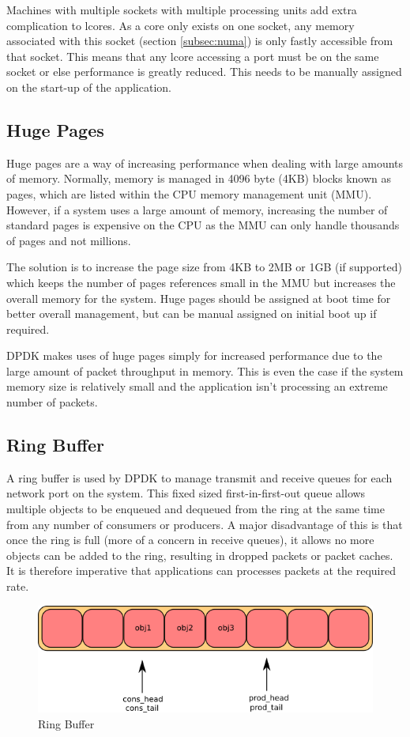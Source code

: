 \documentclass[final_report.tex]{subfiles}
\begin{document}
Machines with multiple sockets with multiple processing units add extra complication to lcores. As a core only exists on one socket, any memory associated with this socket (section \ref{subsec:numa}) is only fastly accessible from that socket. This means that any lcore accessing a port must be on the same socket or else performance is greatly reduced. This needs to be manually assigned on the start-up of the application.

\subsection{Huge Pages}
\label{subsec:hugepages}
Huge pages are a way of increasing performance when dealing with large amounts of memory. Normally, memory is managed in 4096 byte (4KB) blocks known as pages, which are listed within the CPU memory management unit (MMU). However, if a system uses a large amount of memory, increasing the number of standard pages is expensive on the CPU as the MMU can only handle thousands of pages and not millions.

The solution is to increase the page size from 4KB to 2MB or 1GB (if supported) which keeps the number of pages references small in the MMU but increases the overall memory for the system. Huge pages should be assigned at boot time for better overall management, but can be manual assigned on initial boot up if required.

DPDK makes uses of huge pages simply for increased performance due to the large amount of packet throughput in memory. This is even the case if the system memory size is relatively small and the application isn't processing an extreme number of packets.

\subsection{Ring Buffer}
A ring buffer is used by DPDK to manage transmit and receive queues for each network port on the system. This fixed sized first-in-first-out queue allows multiple objects to be enqueued and dequeued from the ring at the same time from any number of consumers or producers. A major disadvantage of this is that once the ring is full (more of a concern in receive queues), it allows no more objects can be added to the ring, resulting in dropped packets or packet caches. It is therefore imperative that applications can processes packets at the required rate.

\begin{figure}[H]
	\centering
	\includegraphics[width=\textwidth]{img/ring.png}
	\caption{Ring Buffer}
	\label{fig:ring}
\end{figure}
\end{document}
